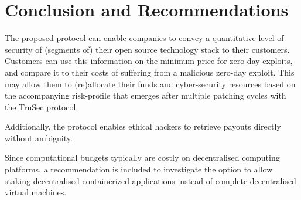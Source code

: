 \section{Conclusion and Recommendations}
\label{sec:conclusion}
The proposed protocol can enable companies to convey a quantitative level of security of (segments of) their open source technology stack to their customers. Customers can use this information on the minimum price for zero-day exploits, and compare it to their costs of suffering from a malicious zero-day exploit. This may allow them to (re)allocate their funds and cyber-security resources based on the accompanying risk-profile that emerges after multiple patching cycles with the TruSec protocol. 

Additionally, the protocol enables ethical hackers to retrieve payouts directly without ambiguity.

Since computational budgets typically are costly on decentralised computing platforms, a recommendation is included to investigate the option to allow staking decentralised containerized applications instead of complete decentralised virtual machines.




